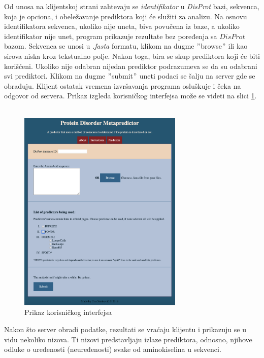 Od unosa na klijentskoj strani zahtevaju se \textit{identifikator} u \textit{DisProt} bazi, sekvenca, koja je opciona, i obeležavanje prediktora koji će služiti za analizu. Na osnovu identifikatora sekvenca, ukoliko nije uneta, biva povučena iz baze, a ukoliko identifikator nije unet, program prikazuje rezultate bez poređenja sa $DisProt$ bazom. Sekvenca se unosi u \textit{.fasta} formatu, klikom na dugme $"$browse$"$ ili kao sirova niska kroz tekstualno polje. Nakon toga, bira se skup prediktora koji će biti korišćeni. Ukoliko nije odabran nijedan prediktor podrazumeva se da su odabrani svi prediktori. Klikom na dugme $"$submit$"$ uneti podaci se šalju na server gde se obrađuju. Klijent ostatak vremena izvršavanja programa osluškuje i čeka na odgovor od servera. Prikaz izgleda korisničkog interfejsa može se videti na slici \ref{fig:interfejs}.\\\\
\begin{figure}[H]
	\centering
    \includegraphics[width=0.7\textwidth]{Figures/App/interfejs.png}
    \caption{Prikaz korisničkog interfejsa}
    \label{fig:interfejs}
\end{figure}

Nakon što server obradi podatke, rezultati se vraćaju klijentu i prikazuju se u vidu nekoliko nizova. Ti nizovi predstavljaju izlaze prediktora, odnosno, njihove odluke o uređenosti (neuređenosti) svake od aminokiselina u sekvenci.\\

